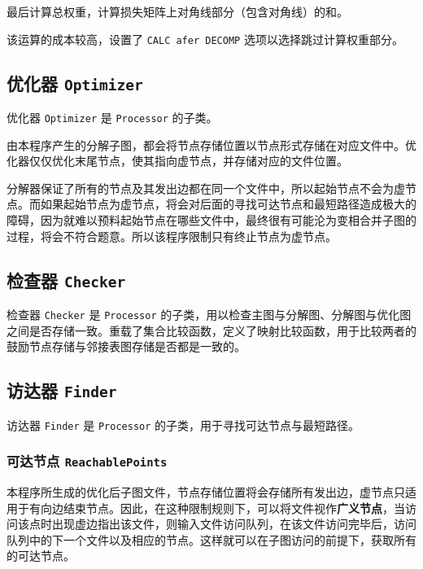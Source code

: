 \documentclass[a4paper,12pt]{article}
\begin{document}
\begin{CJK}{UTF8}{song}
最后计算总权重，计算损失矩阵上对角线部分（包含对角线）的和。

该运算的成本较高，设置了 \texttt{CALC\ afer\ DECOMP}
选项以选择跳过计算权重部分。

\hypertarget{header-n199}{%
\subsection{\texorpdfstring{优化器
\texttt{Optimizer}}{优化器 Optimizer}}\label{header-n199}}

优化器 \texttt{Optimizer} 是 \texttt{Processor} 的子类。

由本程序产生的分解子图，都会将节点存储位置以节点形式存储在对应文件中。优化器仅仅优化末尾节点，使其指向虚节点，并存储对应的文件位置。

分解器保证了所有的节点及其发出边都在同一个文件中，所以起始节点不会为虚节点。而如果起始节点为虚节点，将会对后面的寻找可达节点和最短路径造成极大的障碍，因为就难以预料起始节点在哪些文件中，最终很有可能沦为变相合并子图的过程，将会不符合题意。所以该程序限制只有终止节点为虚节点。

\hypertarget{header-n203}{%
\subsection{\texorpdfstring{检查器
\texttt{Checker}}{检查器 Checker}}\label{header-n203}}

检查器 \texttt{Checker} 是 \texttt{Processor}
的子类，用以检查主图与分解图、分解图与优化图之间是否存储一致。重载了集合比较函数，定义了映射比较函数，用于比较两者的鼓励节点存储与邻接表图存储是否都是一致的。

\hypertarget{header-n206}{%
\subsection{\texorpdfstring{访达器
\texttt{Finder}}{访达器 Finder}}\label{header-n206}}

访达器 \texttt{Finder} 是 \texttt{Processor}
的子类，用于寻找可达节点与最短路径。

\hypertarget{header-n208}{%
\subsubsection{\texorpdfstring{可达节点
\texttt{ReachablePoints}}{可达节点 ReachablePoints}}\label{header-n208}}

本程序所生成的优化后子图文件，节点存储位置将会存储所有发出边，虚节点只适用于有向边结束节点。因此，在这种限制规则下，可以将文件视作\textbf{广义节点}，当访问该点时出现虚边指出该文件，则输入文件访问队列，在该文件访问完毕后，访问队列中的下一个文件以及相应的节点。这样就可以在子图访问的前提下，获取所有的可达节点。


\end{CJK}
\end{document}
